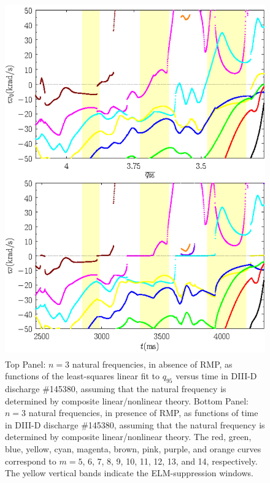 \documentclass[12pt,prb,aps]{revtex4-1}
\begin{document}
\begin{figure}
\includegraphics[height=6in]{fig9.pdf}
\caption{Top Panel: $n=3$ natural frequencies, in absence of RMP, as functions of the least-squares linear fit to $q_{95}$ versus time
in   DIII-D discharge \#145380, assuming that the natural frequency is determined by composite linear/nonlinear theory.
Bottom Panel:  $n=3$ natural frequencies, in presence of RMP, as functions of time
in   DIII-D discharge \#145380, assuming that the natural frequency is determined by composite linear/nonlinear theory. The red, green, blue, yellow, cyan, magenta, brown, pink,
purple, and orange  curves correspond to $m=5$, 6, 7, 8, 9, 10, 11, 12, 13, and 14, respectively. The yellow vertical bands indicate the ELM-suppression windows.} \label{fig9}
\end{figure}
\end{document}

